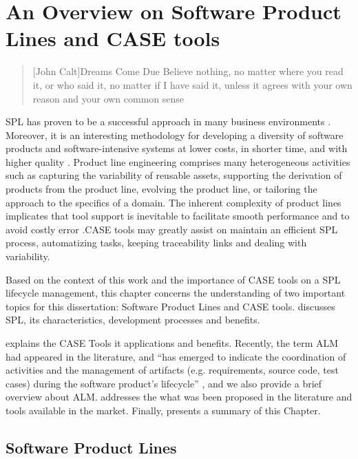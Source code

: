 \chapter{An Overview on Software Product Lines and CASE tools}
\label{ch:background}

\begin{quotation}[John Calt]{Dreams Come Due}
Believe nothing, no matter where you read it, or who said it, no matter if I have said it, unless it agrees with your own reason and your own common sense
\end{quotation}


\ac{SPL} has proven to be a successful approach in many business environments \citep{clements2002software}. Moreover, it is an interesting methodology for developing a diversity of software products and software-intensive systems at lower costs, in shorter time, and with higher quality \citep{Pohl2005}. Product line engineering comprises many heterogeneous activities such as capturing the variability of reusable assets, supporting the derivation of products from the product line, evolving the product line, or tailoring the approach to the specifics of a domain. The inherent complexity of product lines implicates that tool support 
is inevitable to facilitate smooth performance and to avoid costly error \citep{Dhungana2007}.CASE tools may greatly assist on maintain an efficient \acf{SPL} process, automatizing tasks, keeping traceability links and dealing with variability.

Based on the context of this work and the importance of \acf{CASE} tools on a \acf{SPL} lifecycle management, this chapter concerns the understanding of two important topics for this dissertation: Software Product Lines and \ac{CASE} tools.  discusses \acf{SPL}, its characteristics, development processes and benefits. 

 explains the \ac{CASE} Tools it applications and benefits. Recently, the term \acf{ALM} had appeared in the literature, and “has emerged to indicate the coordination of activities and the management of artifacts (e.g. requirements, source code, test cases) during the software product's lifecycle” \citep{Jukka:2009} , and we also provide a brief overview about \ac{ALM}. addresses the what was been proposed in the literature and tools available in the market. Finally,  presents a summary of this Chapter.



\section{Software Product Lines}
\label{sc:productlines}

